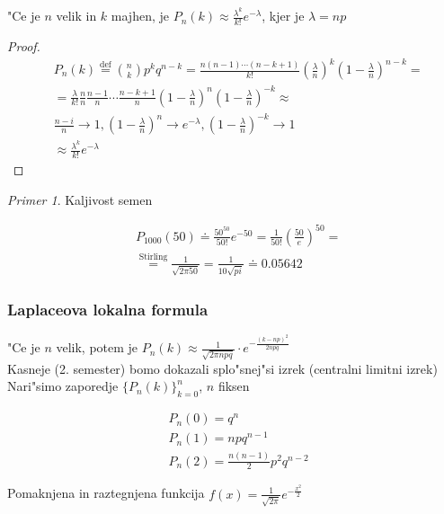 \documentclass[a4paper,12pt]{article}
\theoremstyle{definition}
\theoremstyle{remark}
\newtheorem*{ex}{Primer}
\begin{document}
"Ce je $n$ velik in $k$ majhen, je $P_n(k) \approx \frac{\lambda^k}{k!} e^{-\lambda}$, kjer je $\lambda = np$

\begin{proof}
    \begin{align*}
        &P_n(k) \stackrel{\text{def}}{=} \binom{n}{k} p^k q^{n-k} =
            \frac{n(n-1) \cdots (n-k+1)}{k!} (\frac{\lambda}{n})^k (1 - \frac{\lambda}{n})^{n-k} = \\
        &= \frac{\lambda}{k!} \frac{n}{n} \frac{n-1}{n} \cdots \frac{n-k+1}{n}
            (1 - \frac{\lambda}{n})^n (1 - \frac{\lambda}{n})^{-k} \approx \\
        &\frac{n-i}{n} \to 1, (1 - \frac{\lambda}{n})^n \to e^{-\lambda}, (1 - \frac{\lambda}{n})^{-k} \to 1 \\
        &\approx \frac{\lambda^k}{k!} e^{-\lambda}
    \end{align*}
\end{proof}

\begin{ex}
    Kaljivost semen

    \begin{align*}
        &P_{1000}(50) \doteq \frac{50^{50}}{50!} e^{-50} = \frac{1}{50!} (\frac{50}{e})^{50} = \\
        &\stackrel{\text{Stirling}}{=} \frac{1}{\sqrt{2\pi50}} = \frac{1}{10\sqrt{pi}} \doteq 0.05642
    \end{align*}
\end{ex}

\subsubsection{Laplaceova lokalna formula}

"Ce je $n$ velik, potem je $P_n(k) \approx \frac{1}{\sqrt{2\pi npq}} \cdot e^{-\frac{(k-np)^2}{2npq}}$ \\
Kasneje (2. semester) bomo dokazali splo"snej"si izrek (centralni limitni izrek) \\
Nari"simo zaporedje $\{P_n(k)\}_{k=0}^n$, $n$ fiksen

\begin{align*}
    &P_n(0) = q^n \\
    &P_n(1) = n p q^{n-1} \\
    &P_n(2) = \frac{n(n-1)}{2} p^2 q^{n-2}
\end{align*}

Pomaknjena in raztegnjena funkcija $f(x) = \frac{1}{\sqrt{2\pi}} e^{-\frac{x^2}{2}}$ \\
\end{document}
